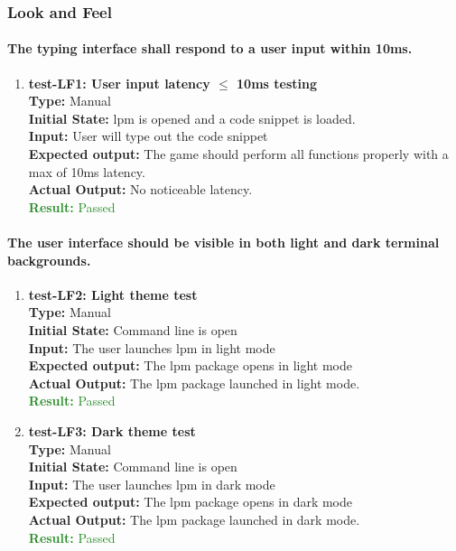 \documentclass[12pt, titlepage]{article}
\begin{document}
\subsubsection{Look and Feel}

\paragraph{The typing interface shall respond to a user input within 10ms.}
\begin{enumerate}
    \item{\textbf{test-LF1: User input latency $\leq$ 10ms testing}\\}
    \textbf{Type:} Manual\\
    \textbf{Initial State:}  lpm is opened and a code snippet is loaded.\\
    \textbf{Input:} User will type out the code snippet\\
    \textbf{Expected output: } The game should perform all functions properly with a max of 10ms latency. \\
    \textbf{Actual Output:} No noticeable latency. \\
    \textcolor{ForestGreen}{\textbf{Result:} Passed}
\end{enumerate}

\paragraph{The user interface should be visible in both light and dark terminal backgrounds.}
\begin{enumerate}
    \item{\textbf{test-LF2: Light theme test}\\}
    \textbf{Type:} Manual\\
    \textbf{Initial State:}  Command line is open\\
    \textbf{Input:} The user launches lpm in light mode\\
    \textbf{Expected output: } The lpm package opens in light mode\\
    \textbf{Actual Output:} The lpm package launched in light mode. \\
    \textcolor{ForestGreen}{\textbf{Result:} Passed}

    \item{\textbf{test-LF3: Dark theme test}\\}
    \textbf{Type:} Manual\\
    \textbf{Initial State:}  Command line is open\\
    \textbf{Input:} The user launches lpm in dark mode\\
    \textbf{Expected output: } The lpm package opens in dark mode\\
    \textbf{Actual Output:} The lpm package launched in dark mode. \\
    \textcolor{ForestGreen}{\textbf{Result:} Passed}
\end{enumerate}
\end{document}
